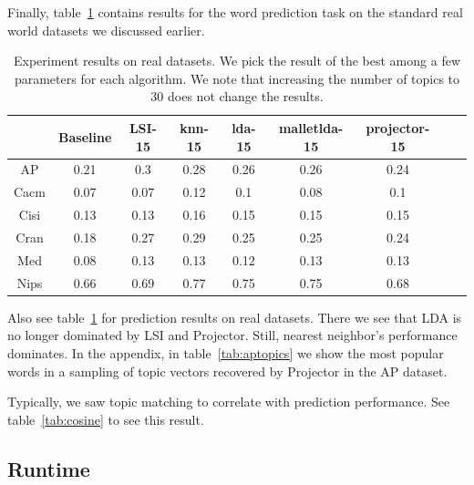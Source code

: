 Finally, table~\ref{tab:real} contains results for the word prediction
task on the standard real world datasets we discussed earlier.

\begin{table}[ht]
{\tiny

\begin{tabular}{|c|c|c|c|c|c|c|c|c|}
\hline 
 &Baseline &LSI-15 &knn-15 &lda-15 &malletlda-15 &projector-15 \\
 \hline 
AP &0.21 &0.3 &0.28 &0.26 &0.26 &0.24 \\
 \hline 
Cacm &0.07 &0.07 &0.12 &0.1 &0.08 &0.1 \\
 \hline 
Cisi &0.13 &0.13 &0.16 &0.15 &0.15 &0.15 \\
 \hline 
Cran &0.18 &0.27 &0.29 &0.25 &0.25 &0.24 \\
 \hline 
Med &0.08 &0.13 &0.13 &0.12 &0.13 &0.13 \\
 \hline 
Nips &0.66 &0.69 &0.77 &0.75 &0.75 &0.68 \\
 \hline 

\end{tabular}

}
\caption{Experiment results on real datasets. We pick the result of the best among a few parameters for each algorithm. We note that increasing the number of topics to 30 does not change the results. }
\label{tab:real}
\end{table}


Also see table~\ref{tab:real} for prediction results on real datasets.  There we see that
LDA is no longer dominated by LSI and Projector.  Still,  nearest neighbor's performance
dominates.  In the appendix, in table~\ref{tab:aptopics} we show the most popular
words in a sampling of topic vectors recovered by Projector in the AP dataset.

Typically, we saw topic matching to correlate with prediction performance.
See table~\ref{tab:cosine} to see this result. 


\subsection{Runtime}

